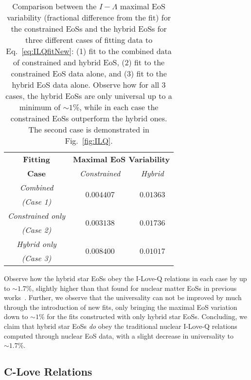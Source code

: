 \documentclass[prd,twocolumn,nofootinbib,superscriptaddress,amsmath,amssymb]{revtex4-1}
\begin{document}
\begin{table}
\centering
\caption{
Comparison between the $I-\Lambda$ maximal EoS variability (fractional difference from the fit) for the constrained EoSs and the hybrid EoSs for three different cases of fitting data to Eq.~\ref{eq:ILQfitNew}: (1) fit to the combined data of constrained and hybrid EoS, (2) fit to the constrained EoS data alone, and (3) fit to the hybrid EoS data alone.
Observe how for all 3 cases, the hybrid EoSs are only universal up to a minimum of $\sim1$\%, while in each case the constrained EoSs outperform the hybrid ones.
The second case is demonstrated in Fig.~\ref{fig:ILQ}.
}\label{tab:hybridCompare}
\begin{tabular}{ c  || c c } 
 \hline
 \hline
 \textbf{Fitting} & \multicolumn{2}{c}{\textbf{Maximal EoS Variability}} \\
 \cline{2-3}
 \textbf{Case} &  \multicolumn{1}{c|}{\emph{Constrained}} & \emph{Hybrid}\\
 \hline
 \emph{Combined} &  \multirow{2}{*}{$0.004407$} & \multirow{2}{*}{$0.01363$}\\
 \emph{(Case 1)} & &\\
 \cline{1-1}
 \emph{Constrained only} & \multirow{2}{*}{$0.003138$} & \multirow{2}{*}{$0.01736$}\\
  \emph{(Case 2)} & &\\
  \cline{1-1}
 \emph{Hybrid only} & \multirow{2}{*}{$0.008400$} & \multirow{2}{*}{$0.01017$}\\
  \emph{(Case 3)} & &\\
  \cline{1-1}
\hline
\hline
\end{tabular}
\end{table}

Observe how the hybrid star EoSs obey the I-Love-Q relations in each case by up to $\sim1.7$\%, slightly higher than that found for nuclear matter EoSs in previous works~\cite{Yagi:ILQ}.
Further, we observe that the universality can not be improved by much through the introduction of new fits, only bringing the maximal EoS variation down to $\sim1$\% for the fits constructed with only hybrid star EoSs.
Concluding, we claim that hybrid star EoSs \emph{do} obey the traditional nuclear I-Love-Q relations computed through nuclear EoS data, with a slight decrease in universality to $\sim1.7$\%.  


\subsection{C-Love Relations}
\label{sec:clove}
\end{document}
